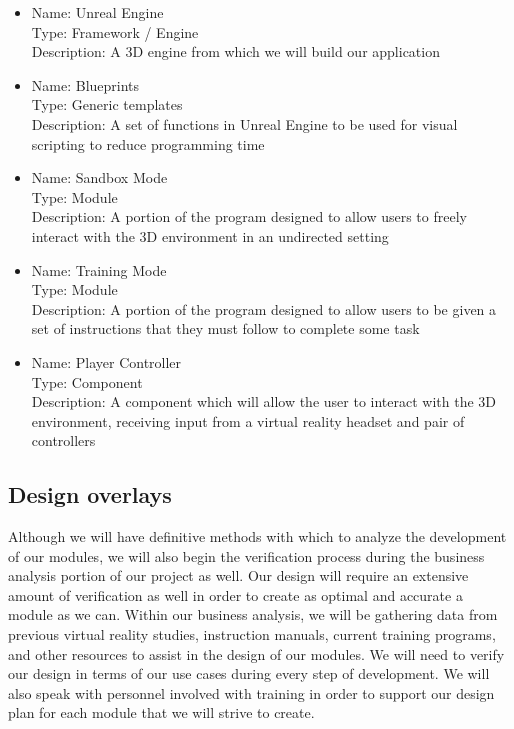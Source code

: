 \documentclass[onecolumn, draftclsnofoot,10pt, compsoc]{IEEEtran}
\begin{document}
\begin{itemize}
    \item Name: Unreal Engine\\
          Type: Framework / Engine\\
          Description: A 3D engine from which we will build our application 
    \item Name: Blueprints\\
          Type: Generic templates\\
          Description: A set of functions in Unreal Engine to be used for visual scripting to reduce programming time
    \item Name: Sandbox Mode\\
          Type: Module\\
          Description: A portion of the program designed to allow users to freely interact with the 3D environment in an undirected setting 
    \item Name: Training Mode\\
          Type: Module\\
          Description: A portion of the program designed to allow users to be given a set of instructions that they must follow to complete some task
    \item Name: Player Controller\\
          Type: Component\\
          Description: A component which will allow the user to interact with the 3D environment, receiving input from a virtual reality headset and pair of controllers
\end{itemize}

\subsection{Design overlays}
Although we will have definitive methods with which to analyze the development of our modules, we will also begin the verification process during the business analysis portion of our project as well. Our design will require an extensive amount of verification as well in order to create as optimal and accurate a module as we can. Within our business analysis, we will be gathering data from previous virtual reality studies, instruction manuals, current training programs, and other resources to assist in the design of our modules. We will need to verify our design in terms of our use cases during every step of development. We will also speak with personnel involved with training in order to support our design plan for each module that we will strive to create. 
\end{document}
